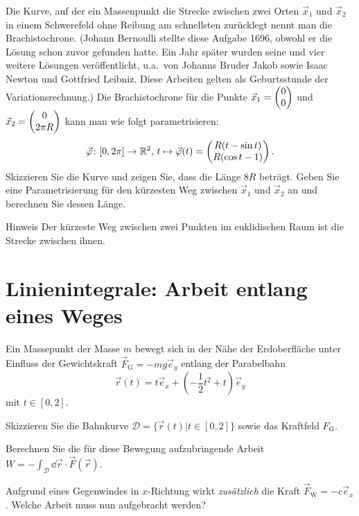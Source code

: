 \documentclass{scrartcl}
\renewcommand{\ee}{\vec{e}}
\begin{document}
Die Kurve, auf der ein Massenpunkt die Strecke zwischen zwei Orten $\vec x_1$ und $\vec x_2$ in einem Schwerefeld ohne Reibung am schnellsten zurücklegt nennt man die Brachistochrone.
(Johann Bernoulli stellte diese Aufgabe 1696, obwohl er die Lösung schon zuvor gefunden hatte. 
Ein Jahr später wurden seine und vier weitere Lösungen veröffentlicht, u.a.\ von Johanns Bruder Jakob sowie Isaac Newton und Gottfried Leibniz. 
Diese Arbeiten gelten als Geburtsstunde der Variationsrechnung.)
Die Brachistochrone für die Punkte $\vec x_1 = \begin{pmatrix}0 \\ 0\end{pmatrix}$ und $\vec x_2 = \begin{pmatrix}0 \\ 2 \pi R\end{pmatrix}$ kann man wie folgt parametrisieren:
\[
  \vec{\varphi}\colon [0, 2\pi] \to \mathbb{R}^2, \, t \mapsto \vec\varphi(t) = \begin{pmatrix}R (t - \sin t) \\ R (\cos t - 1)\end{pmatrix}.
\]
Skizzieren Sie die Kurve und zeigen Sie, dass die Länge $8R$ beträgt. 
Geben Sie eine Parametrisierung für den kürzesten Weg zwischen $\vec x_1$ und $\vec x_2$ an und berechnen Sie dessen Länge.
\begin{remark}{Hinweis}
  Der kürzeste Weg zwischen zwei Punkten im euklidischen Raum ist die Strecke zwischen ihnen.
\end{remark}


\section{Linienintegrale: Arbeit entlang eines Weges~}
\label{sec:linienintegrale_arbeit_entlang_eines_weges}

Ein Massepunkt der Masse $m$ bewegt sich in der Nähe der Erdoberfläche unter Einfluss der Gewichtskraft $\vec F_\mathrm{G} = - m g \ee_y$ entlang der Parabelbahn
\[
  \vec r(t) = t \ee_x + \left( -\frac{1}{2} t^2 + t \right) \ee_y
\]
mit $t \in [0,2]$.
\begin{subex}
  \item{} Skizzieren Sie die Bahnkurve $\mathcal{D} = \{ \vec r(t) | t \in [0,2] \}$ sowie das Kraftfeld $F_\mathrm{G}$.
  \item{} Berechnen Sie die für diese Bewegung aufzubringende Arbeit $W = - \int_\mathcal{D} \dd \vec r \cdot \vec F(\vec r)$.
  \item{} Aufgrund eines Gegenwindes in $x$-Richtung wirkt \emph{zusätzlich} die Kraft $\vec F_\mathrm{W} = - c \ee_x$. Welche Arbeit muss nun aufgebracht werden?
\end{subex}
\end{document}
